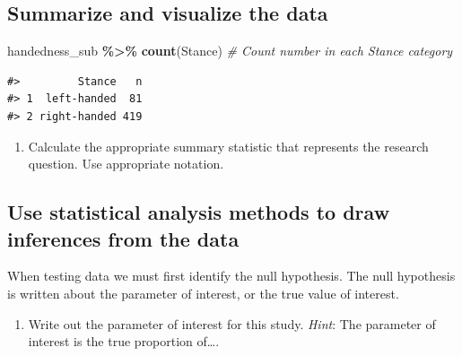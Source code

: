 \documentclass[
]{report}
\newenvironment{Shaded}{\begin{snugshade}}{\end{snugshade}}
\newcommand{\CommentTok}[1]{\textcolor[rgb]{0.56,0.35,0.01}{\textit{#1}}}
\newcommand{\KeywordTok}[1]{\textcolor[rgb]{0.13,0.29,0.53}{\textbf{#1}}}
\newcommand{\NormalTok}[1]{#1}
\newcommand{\OperatorTok}[1]{\textcolor[rgb]{0.81,0.36,0.00}{\textbf{#1}}}
\newcommand{\StringTok}[1]{\textcolor[rgb]{0.31,0.60,0.02}{#1}}
\providecommand{\tightlist}{%
  \setlength{\itemsep}{0pt}\setlength{\parskip}{0pt}}
\begin{document}
\vspace{1in}

\hypertarget{summarize-and-visualize-the-data}{%
\subsection*{Summarize and visualize the data}\label{summarize-and-visualize-the-data}}

\begin{Shaded}
\begin{Highlighting}[]
\NormalTok{handedness\_sub }\OperatorTok{\%\textgreater{}\%}\StringTok{ }\KeywordTok{count}\NormalTok{(Stance)  }\CommentTok{\# Count number in each Stance category}
\end{Highlighting}
\end{Shaded}

\begin{verbatim}
#>         Stance   n
#> 1  left-handed  81
#> 2 right-handed 419
\end{verbatim}

\begin{enumerate}
\def\labelenumi{\arabic{enumi}.}
\setcounter{enumi}{7}
\tightlist
\item
  Calculate the appropriate summary statistic that represents the research question. Use appropriate notation.
\end{enumerate}

\vspace{0.5in}

\hypertarget{use-statistical-analysis-methods-to-draw-inferences-from-the-data}{%
\subsection*{Use statistical analysis methods to draw inferences from the data}\label{use-statistical-analysis-methods-to-draw-inferences-from-the-data}}

When testing data we must first identify the null hypothesis. The null hypothesis is written about the parameter of interest, or the true value of interest.

\begin{enumerate}
\def\labelenumi{\arabic{enumi}.}
\setcounter{enumi}{8}
\tightlist
\item
  Write out the parameter of interest for this study. \emph{Hint}: The parameter of interest is the true proportion of\ldots.
\end{enumerate}
\end{document}
